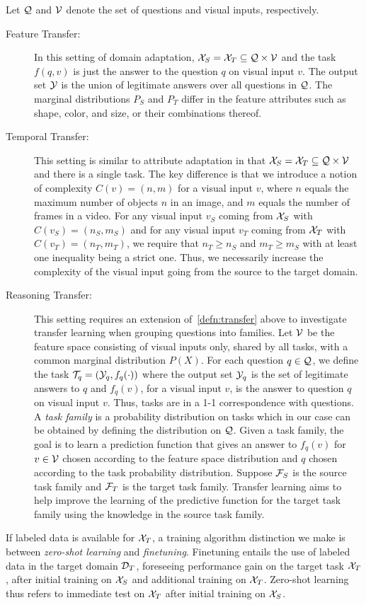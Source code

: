 Let $\mathcal{Q}$ and $\mathcal{V}$ denote the set of questions and visual inputs, respectively.
\begin{description}
	\item[Feature Transfer:] In this setting of domain adaptation, $\mathcal{X}_S = \mathcal{X}_T \subseteq \mathcal{Q} \times \mathcal{V}$
	and the task $f(q,v)$ is just the answer to the question $q$ on visual input $v$. The output set $\mathcal{Y}$ is the union of legitimate answers
	over all questions in $\mathcal{Q}$.
	The marginal distributions $P_S$ and $P_T$ differ in the feature attributes such as shape, color, and size, or their combinations
	thereof.

	\item[Temporal Transfer:] This setting is similar to attribute adaptation in that $\mathcal{X}_S = \mathcal{X}_T \subseteq \mathcal{Q} \times \mathcal{V}$
	and there is a single task.
	The key difference is that we introduce a notion of complexity $C(v) = (n, m)$ for a visual input $v$,
	where $n$ equals the maximum number of objects $n$ in an image, and $m$
	equals  the number of frames in a video.
	For any visual input $v_S$ coming from $\mathcal{X}_S$ with $C(v_S) = (n_S, m_S)$
	and for any visual input $v_T$ coming from $\mathcal{X}_T$ with $C(v_T) = (n_T, m_T)$, we require that $n_T \ge n_S$ and
	$m_T \ge m_S$ with at least one inequality being a strict one.
	Thus, we necessarily increase the complexity of the visual input going from the source to the target domain.

	\item[Reasoning Transfer:]
	This setting requires an extension of~\cref{defn:transfer} above to investigate transfer learning when
	grouping questions into families. Let $\mathcal{V}$ be the feature space consisting of visual inputs only, shared by
	all tasks, with a common marginal distribution $P(X)$. For each question $q \in \mathcal{Q}$, we define the task
	$\mathcal{T}_q = (\mathcal{Y}_q, f_q(\cdot))$ where
	the output set $\mathcal{Y}_q$ is the set of legitimate answers to $q$ and $f_q(v)$, for a visual input $v$,
	is the answer to question $q$ on visual input $v$.
	Thus, tasks are in a 1-1 correspondence with questions.
	A \emph{task family} is a probability distribution on tasks which in our case can be obtained by defining the distribution on $\mathcal{Q}$.
	Given a task family, the goal is to learn a prediction function that gives an answer to $f_q(v)$ for $v \in \mathcal{V}$ chosen according
	to the feature space distribution and $q$ chosen according to the task probability distribution.
	Suppose $\mathcal{F}_S$ is the source task family and $\mathcal{F}_T$ is the target task family.
	Transfer learning aims to help improve the learning of the predictive function for the target task family
	using the knowledge in the source task family.

\end{description}

If labeled data is available for $\mathcal{X}_T$, a training algorithm distinction we make is between \emph{zero-shot learning} and \emph{finetuning}. Finetuning entails the use of labeled data in the target domain $\mathcal{D}_T$, foreseeing performance gain on the target task $\mathcal{X}_T$, after initial training on $\mathcal{X}_S$ and additional training on $\mathcal{X}_T$. Zero-shot learning thus refers to immediate test on $\mathcal{X}_T$ after initial training on $\mathcal{X}_S$.
